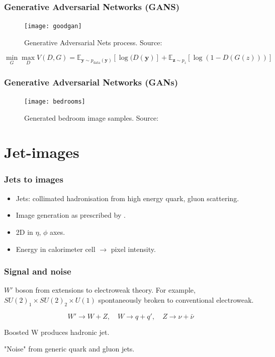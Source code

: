 \documentclass{beamer}
\begin{document}
		\begin{frame}
			\frametitle{Generative Adversarial Networks (GANS)}
			\begin{figure}[H]
				\centering
				\texttt{[image: goodgan]}
				
				\caption{Generative Adversarial Nets process. Source: \textit{\autocite{GoodfellowNips}}}
				\label{fig:gandiag}
			
			\end{figure}
		
		$$
		\min_{G}\max_{D}V(D,G) = \mathbb{E}_{\mathbf{y}\sim p_{\text{data}}(\mathbf{y})} [\log(D(\mathbf{y})] + \mathbb{E}_{\mathbf{z}\sim p_{z}} [\log(1-D(G(z)))] 
		$$
		\end{frame}
	
		\begin{frame}
			\frametitle{Generative Adversarial Networks (GANs)}
			\begin{figure}[H]
				\centering
				\texttt{[image: bedrooms]}
				
				\caption{Generated bedroom image samples. Source: \textit{\autocite{GoodfellowNips}}}
				
			\end{figure}
		\end{frame}
	
	\section{Jet-images}
	\label{sec:jetims}
		\begin{frame}
			\frametitle{Jets to images}
			\begin{itemize}
				\item Jets: collimated hadronisation from high energy quark, gluon scattering.
				\item Image generation as prescribed by \textit{\cite{de2015jet}}.
				\item 2D in $\eta$, $\phi$ axes.
				\item Energy in calorimeter cell $\rightarrow$ pixel intensity.
			\end{itemize}
		\end{frame}
	
		\begin{frame}
			\frametitle{Signal and noise}
			 $W'$ boson from extensions to electroweak theory.
			 For example, $SU(2)_1 \times SU(2)_2 \times U(1)$ spontaneously broken to conventional electroweak. 
			 
			 $$
			 W' \rightarrow W + Z, \quad W \rightarrow q + q', \quad Z \rightarrow \nu + \bar{\nu}
			 $$
			 \begin{block}{}
			 	\centering
			 	Boosted W produces hadronic jet.
			 \end{block}
			 
			 "Noise" from generic quark and gluon jets.
		\end{frame}
	
\end{document}

